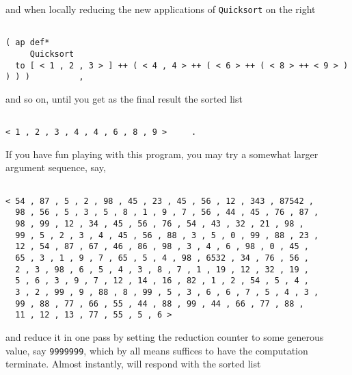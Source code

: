 and when locally reducing the new applications of {\tt Quicksort} on the right
\begin{verbatim}

( ap def*
     Quicksort
  to [ < 1 , 2 , 3 > ] ++ ( < 4 , 4 > ++ ( < 6 > ++ ( < 8 > ++ < 9 > ) ) ) )          ,

\end{verbatim}
and so on, until you get as the final result the sorted list
\begin{verbatim}

< 1 , 2 , 3 , 4 , 4 , 6 , 8 , 9 >     .

\end{verbatim}
If you have fun playing with this program, you may try a somewhat larger argument sequence, say,
\begin{verbatim}

< 54 , 87 , 5 , 2 , 98 , 45 , 23 , 45 , 56 , 12 , 343 , 87542 ,
  98 , 56 , 5 , 3 , 5 , 8 , 1 , 9 , 7 , 56 , 44 , 45 , 76 , 87 ,
  98 , 99 , 12 , 34 , 45 , 56 , 76 , 54 , 43 , 32 , 21 , 98 ,
  99 , 5 , 2 , 3 , 4 , 45 , 56 , 88 , 3 , 5 , 0 , 99 , 88 , 23 ,
  12 , 54 , 87 , 67 , 46 , 86 , 98 , 3 , 4 , 6 , 98 , 0 , 45 ,
  65 , 3 , 1 , 9 , 7 , 65 , 5 , 4 , 98 , 6532 , 34 , 76 , 56 ,
  2 , 3 , 98 , 6 , 5 , 4 , 3 , 8 , 7 , 1 , 19 , 12 , 32 , 19 ,
  5 , 6 , 3 , 9 , 7 , 12 , 14 , 16 , 82 , 1 , 2 , 54 , 5 , 4 ,
  3 , 2 , 99 , 9 , 88 , 8 , 99 , 5 , 3 , 6 , 6 , 7 , 5 , 4 , 3 ,
  99 , 88 , 77 , 66 , 55 , 44 , 88 , 99 , 44 , 66 , 77 , 88 ,
  11 , 12 , 13 , 77 , 55 , 5 , 6 >

\end{verbatim}
and reduce it in one pass by setting the reduction counter to  some generous value, say 
{\tt 9999999}, which by all means suffices to have the computation terminate. Almost instantly,
\pired will respond with the sorted list
